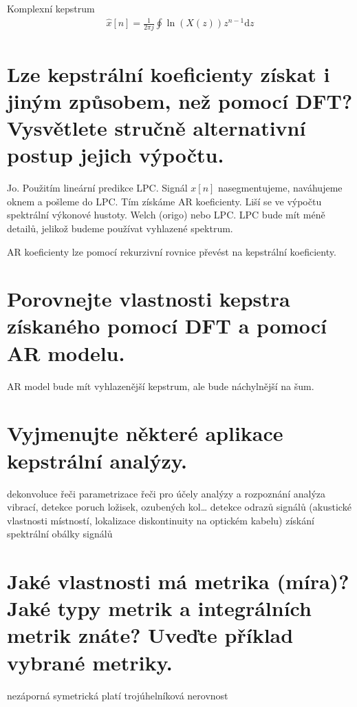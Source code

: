 \documentclass[a4paper,12pt]{article}   %
\newcommand{\mt}[1]{$#1$}
\newcommand{\dd}{\text{d}}
\begin{document}
Komplexní kepstrum
\begin{align*}
        \hat{x}[n] = \frac{1}{2\pi j}\oint \ln(X(z))z^{n-1}\dd z
\end{align*}




\section{Lze kepstrální koeficienty získat i jiným způsobem, než pomocí DFT? Vysvětlete stručně alternativní postup jejich výpočtu.}

Jo. Použitím lineární predikce LPC. Signál \mt{x[n]} nasegmentujeme, naváhujeme oknem a pošleme do LPC. Tím získáme AR koeficienty. Liší se ve výpočtu spektrální výkonové hustoty. Welch (origo) nebo LPC. LPC bude mít méně detailů, jelikož budeme používat vyhlazené spektrum. 

AR koeficienty lze pomocí rekurzivní rovnice převést na kepstrální koeficienty. 


\section{Porovnejte vlastnosti kepstra získaného pomocí DFT a pomocí AR modelu.}

AR model bude mít vyhlazenější kepstrum, ale bude náchylnější na šum.


\section{Vyjmenujte některé aplikace kepstrální analýzy.}
\begin{outline}
        \1 dekonvoluce řeči
        \1 parametrizace řeči pro účely analýzy a rozpoznání
        \1 analýza vibrací, detekce poruch ložisek, ozubených kol\dots
        \1 detekce odrazů signálů (akustické vlastnosti místností, lokalizace diskontinuity na optickém kabelu)
        \1 získání spektrální obálky signálů
\end{outline}


\section{Jaké vlastnosti má metrika (míra)? Jaké typy metrik a integrálních metrik znáte? Uveďte příklad vybrané metriky.}
\begin{outline}
        \1 nezáporná
        \1 symetrická
        \1 platí trojúhelníková nerovnost
\end{outline}
\end{document}
